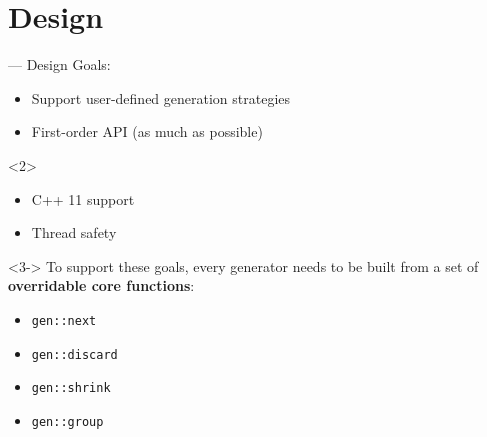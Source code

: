 \section{Design}

\begin{frame}[t]{\halcheck{} --- Design}
  Goals:
  \begin{itemize}
    \item Support user-defined generation strategies
    \item First-order API (as much as possible)
  \end{itemize}

  \begin{onlyenv}<2>
    \begin{itemize}
      \item C++ 11 support
      \item Thread safety
    \end{itemize}
  \end{onlyenv}

  \begin{onlyenv}<3->
    To support these goals, every generator needs to be built from a set of \textbf{overridable core functions}:

    \begin{itemize}
      \item<4-> \texttt{gen::next}
      \item<4-> \texttt{gen::discard}
      \item<4-> \texttt{gen::shrink}
      \item<4-> \texttt{gen::group}
    \end{itemize}
  \end{onlyenv}
\end{frame}

